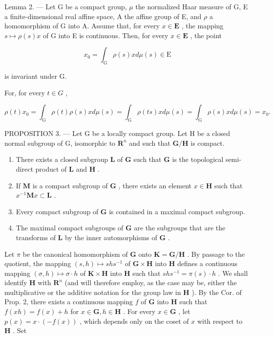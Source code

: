 Lemma 2. --- Let G be a compact group, \(\mu\) the normalized Haar measure of G, E a finite-dimensional real affine space, A the affine group of E, and \(\rho\) a homomorphism of G into A. Assume that, for every \(x \in \mathbf{E}\) , the mapping \(s \mapsto \rho(s)x\) of G into E is continuous. Then, for every \(x \in \mathbf{E}\) , the point

\[
x _ {0} = \int_ {\mathrm{G}} \rho (s) x d \mu (s) \in \mathrm{E}
\]

is invariant under G.

For, for every \(t \in G\) ,

\[
\rho (t) x _ {0} = \int_ {\mathrm{G}} \rho (t) \rho (s) x d \mu (s) = \int_ {\mathrm{G}} \rho (t s) x d \mu (s) = \int_ {\mathrm{G}} \rho (s) x d \mu (s) = x _ {0}.
\]

PROPOSITION 3. --- Let G be a locally compact group. Let H be a closed normal subgroup of G, isomorphic to \(\mathbf{R}^n\) and such that \(\mathbf{G} / \mathbf{H}\) is compact.

\begin{enumerate}
\def\labelenumi{\alph{enumi})}
\item
  There exists a closed subgroup \(\mathbf{L}\) of \(\mathbf{G}\) such that \(\mathbf{G}\) is the topological semi-direct product of \(\mathbf{L}\) and \(\mathbf{H}\) .
\item
  If \(\mathbf{M}\) is a compact subgroup of \(\mathbf{G}\) , there exists an element \(x \in \mathbf{H}\) such that \(x^{-1}\mathbf{M}x \subset \mathbf{L}\) .
\item
  Every compact subgroup of \(\mathbf{G}\) is contained in a maximal compact subgroup.
\item
  The maximal compact subgroups of \(\mathbf{G}\) are the subgroups that are the transforms of \(\mathbf{L}\) by the inner automorphisms of \(\mathbf{G}\) .
\end{enumerate}

Let \(\pi\) be the canonical homomorphism of \(\mathbf{G}\) onto \(\mathbf{K} = \mathbf{G} / \mathbf{H}\) . By passage to the quotient, the mapping \((s,h)\mapsto shs^{-1}\) of \(\mathbf{G}\times \mathbf{H}\) into \(\mathbf{H}\) defines a continuous mapping \((\sigma ,h)\mapsto \sigma \cdot h\) of \(\mathbf{K}\times \mathbf{H}\) into \(\mathbf{H}\) such that \(shs^{-1} = \pi (s)\cdot h\) . We shall identify \(\mathbf{H}\) with \(\mathbf{R}^n\) (and will therefore employ, as the case may be, either the multiplicative or the additive notation for the group law in \(\mathbf{H}\) ). By the Cor. of Prop. 2, there exists a continuous mapping \(f\) of \(\mathbf{G}\) into \(\mathbf{H}\) such that \(f(xh) = f(x) + h\) for \(x\in \mathbf{G}, h\in \mathbf{H}\) . For every \(x\in \mathbf{G}\) , let \(p(x) = x\cdot (-f(x))\) , which depends only on the coset of \(x\) with respect to \(\mathbf{H}\) . Set

